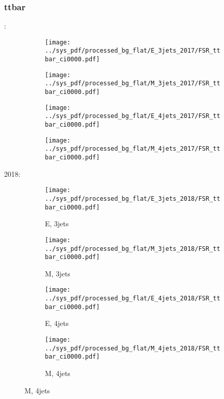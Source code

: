 \documentclass{beamer}
\begin{document}
\begin{frame}
\frametitle{ttbar}
\fontsize{5}{1}:
\begin{figure}
\centering
\begin{subfigure}[b]{0.24\textwidth}
\texttt{[image: ../sys\_pdf/processed\_bg\_flat/E\_3jets\_2017/FSR\_ttbar\_ci0000.pdf]}
\end{subfigure}
\begin{subfigure}[b]{0.24\textwidth}
\texttt{[image: ../sys\_pdf/processed\_bg\_flat/M\_3jets\_2017/FSR\_ttbar\_ci0000.pdf]}
\end{subfigure}
\begin{subfigure}[b]{0.24\textwidth}
\texttt{[image: ../sys\_pdf/processed\_bg\_flat/E\_4jets\_2017/FSR\_ttbar\_ci0000.pdf]}
\end{subfigure}
\begin{subfigure}[b]{0.24\textwidth}
\texttt{[image: ../sys\_pdf/processed\_bg\_flat/M\_4jets\_2017/FSR\_ttbar\_ci0000.pdf]}
\end{subfigure}
\end{figure}
2018:
\begin{figure}
\centering
\begin{subfigure}[b]{0.24\textwidth}
\texttt{[image: ../sys\_pdf/processed\_bg\_flat/E\_3jets\_2018/FSR\_ttbar\_ci0000.pdf]}
\captionsetup{font=tiny}
\caption{E, 3jets}
\end{subfigure}
\begin{subfigure}[b]{0.24\textwidth}
\texttt{[image: ../sys\_pdf/processed\_bg\_flat/M\_3jets\_2018/FSR\_ttbar\_ci0000.pdf]}
\captionsetup{font=tiny}
\caption{M, 3jets}
\end{subfigure}
\begin{subfigure}[b]{0.24\textwidth}
\texttt{[image: ../sys\_pdf/processed\_bg\_flat/E\_4jets\_2018/FSR\_ttbar\_ci0000.pdf]}
\captionsetup{font=tiny}
\caption{E, 4jets}
\end{subfigure}
\begin{subfigure}[b]{0.24\textwidth}
\texttt{[image: ../sys\_pdf/processed\_bg\_flat/M\_4jets\_2018/FSR\_ttbar\_ci0000.pdf]}
\captionsetup{font=tiny}
\caption{M, 4jets}
\end{subfigure}
\end{figure}
\end{frame}
\end{document}
